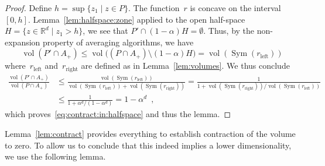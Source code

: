 \documentclass[a4paper,USenglish]{lipics-v2021}
\DeclareMathOperator{\vol}{vol}
\DeclareMathOperator{\Sym}{Sym}
\newcommand{\IR}{\mathbb{R}}
\renewcommand{\leq}{\leqslant}
\begin{document}
\begin{proof}
	Define $h = \sup\{ z_1 \mid z\in P\}$.
	The function~$r$ is concave on the interval~$[0,h]$.
	Lemma~\ref{lem:halfspace:zone} applied to the open half-space
	$H = \{ z\in \IR^d \mid z_1 > h\}$, we see that
	$P' \cap (1-\alpha)H = \emptyset$.
	Thus, by the non-expansion property of averaging algorithms, we have
	\begin{equation*}
		\vol(P'\cap A_+) \leq \vol\big((P\cap A_+) \setminus (1-\alpha)H\big) =  \vol(\Sym(r_\mathrm{left}))
	\end{equation*}
	where~$r_\mathrm{left}$ and~$r_\mathrm{right}$ are defined as in Lemma~\ref{lem:volumes}.
	We thus conclude
	\begin{equation*}
		\begin{split}
			\frac{\vol(P'\cap A_+)}{\vol(P\cap A_+)}
			& \leq
			\frac{\vol(\Sym(r_\mathrm{left}))}{\vol(\Sym(r_\mathrm{left})) + \vol(\Sym(r_\mathrm{right}))}
			=
			\frac{1}{1 + \vol(\Sym(r_\mathrm{right}))/ \vol(\Sym(r_\mathrm{left}))}
			\\
			& \leq
			\frac{1}{1 + \alpha^d/(1-\alpha^d)}
			=
			1 - \alpha^d
			\enspace,
		\end{split}
	\end{equation*}
	which proves~\eqref{eq:contract:in:halfspace}
	and thus the lemma.
\end{proof}

Lemma~\ref{lem:contract} provides everything to establish contraction of the volume to zero.
To allow us to conclude that this indeed implies a lower dimensionality, we use the following lemma.
\end{document}
